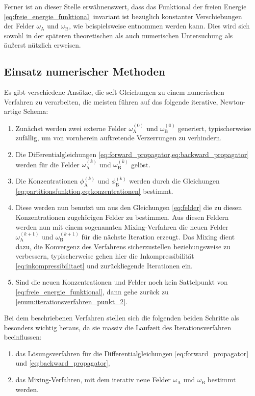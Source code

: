 Ferner ist an dieser Stelle erwähnenswert, dass das Funktional der freien Energie \cref{eq:freie_energie_funktional} invariant ist bezüglich konstanter Verschiebungen der Felder $\omega_{\mathrm{A}}$ und $\omega_{\mathrm{B}}$, wie beispielsweise \cite{Ceniceros:2006is} entnommen werden kann.
Dies wird sich sowohl in der späteren theoretischen als auch numerischen Untersuchung als äußerst nützlich erweisen.


\subsection*{Einsatz numerischer Methoden} %

Es gibt verschiedene Ansätze, die \ac{scft}-Gleichungen zu einem numerischen Verfahren zu verarbeiten, die meisten führen auf das folgende iterative, Newton-artige Schema:
\begin{enumerate}[label={\itshape\roman*.},ref={\itshape\roman*}]
    \item Zunächst werden zwei externe Felder $\omega^{(0)}_{\mathrm{A}}$ und $\omega^{(0)}_{\mathrm{B}}$ generiert, typischerweise zufällig, um von vornherein auftretende Verzerrungen zu verhindern.
    \item\label{enum:iterationsverfahren_punkt_2} Die Differentialgleichungen \cref{eq:forward_propagator,eq:backward_propagator} werden für die Felder $\omega^{(k)}_{\mathrm{A}}$ und $\omega^{(k)}_{\mathrm{B}}$ gelöst.
    \item Die Konzentrationen $\phi^{(k)}_{\mathrm{A}}$ und $\phi^{(k)}_{\mathrm{B}}$ werden durch die Gleichungen \cref{eq:partitionsfunktion,eq:konzentrationen} bestimmt.
    \item Diese werden nun benutzt um aus den Gleichungen \cref{eq:felder} die zu diesen Konzentrationen zugehörigen Felder zu bestimmen.
    Aus diesen Feldern werden nun mit einem sogenannten Mixing-Verfahren die neuen Felder $\omega^{(k+1)}_{\mathrm{A}}$ und $\omega^{(k+1)}_{\mathrm{B}}$ für die nächste Iteration erzeugt.
    Das Mixing dient dazu, die Konvergenz des Verfahrens sicherzustellen beziehungsweise zu verbessern, typischerweise gehen hier die Inkompressibilität \cref{eq:inkompressibilitaet} und zurückliegende Iterationen ein.
    \item Sind die neuen Konzentrationen und Felder noch kein Sattelpunkt von \cref{eq:freie_energie_funktional}, dann gehe zurück zu \cref{enum:iterationsverfahren_punkt_2}.
\end{enumerate}

Bei dem beschriebenen Verfahren stellen sich die folgenden beiden Schritte als besonders wichtig heraus, da sie massiv die Laufzeit des Iterationsverfahren beeinflussen:
\begin{enumerate}[label={\itshape\roman*.}]
    \item das Lösungsverfahren für die Differentialgleichungen \cref{eq:forward_propagator} und \cref{eq:backward_propagator},
    \item das Mixing-Verfahren, mit dem iterativ neue Felder $\omega_{\mathrm{A}}$ und $\omega_{\mathrm{B}}$ bestimmt werden.
\end{enumerate}

